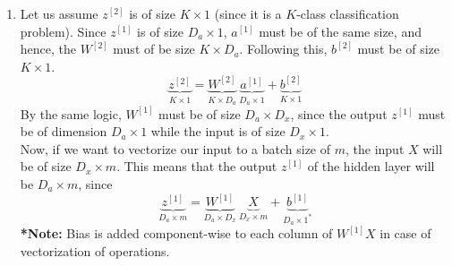 \documentclass[10pt]{article}
\begin{document}
    \begin{enumerate}[label=(\alph*)]
        \item Let us assume $z^{[2]}$ is of size $K \times 1$ (since it is a $K$-class
        classification problem). Since $z^{[1]}$ is of size $D_{a} \times 1$, $a^{[1]}$
        must be of the same size, and hence, the $W^{[2]}$ must of be size $K \times D_{a}$.
        Following this, $b^{[2]}$ must be of size $K \times 1$.
        \begin{equation*}
            \underbrace{z^{[2]}}_{K \times 1} = \underbrace{W^{[2]}}_{K \times D_{a}} \
            \underbrace{a^{[1]}}_{D_{a} \times 1} + \underbrace{b^{[2]}}_{K \times 1}
        \end{equation*}
        By the same logic, $W^{[1]}$ must be of size $D_{a} \times D_{x}$, since the output $z^{[1]}$ must
        be of dimension $D_{a} \times 1$ while the input is of size $D_{x} \times 1$. \\
        Now, if we want to vectorize our input to a batch size of $m$, the input $X$ will be of
        size $D_{x} \times m$. This means that the output $z^{[1]}$ of the hidden layer will be
        $D_{a} \times m$, since
        \begin{equation*}
            \underbrace{z^{[1]}}_{D_{a} \times m} = \underbrace{W^{[1]}}_{D_{a} \times D_{x}} \
            \underbrace{X}_{D_{x} \times m} + \underbrace{b^{[1]}}_{D_{a} \times 1^{\textbf{*}}}
        \end{equation*}
        \textbf{*Note:} Bias is added component-wise to each column of $W^{[1]} X$ in case of
        vectorization of operations.


\end{enumerate}
\end{document}
